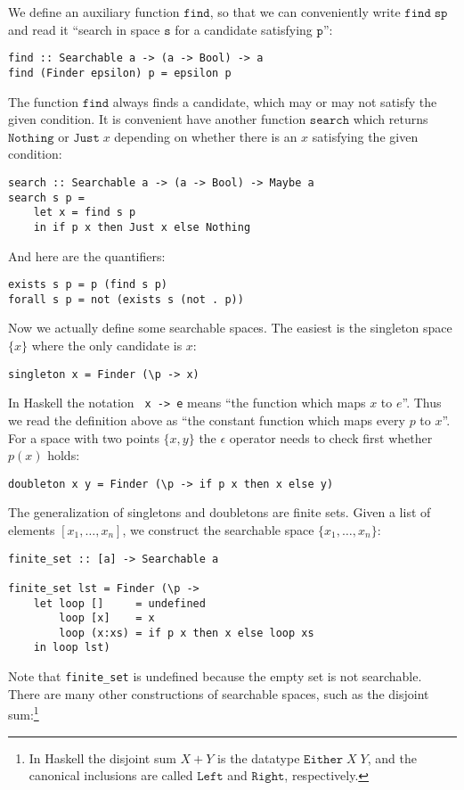 \documentclass[a4paper,10pt]{article}
\newcommand{\set}[1]{\{#1\}}
\newcommand{\R}[1]{\mathtt{#1}}
\begin{document}
We define an auxiliary function $\mathtt{find}$, so that we can
conveniently write $\R{find}\;\R{s}\R{p}$ and read it ``search in
space $\R{s}$ for a candidate satisfying $\R{p}$'':
%
\begin{lstlisting}
find :: Searchable a -> (a -> Bool) -> a
find (Finder epsilon) p = epsilon p
\end{lstlisting}
%
The function $\mathtt{find}$ always finds a candidate, which may or
may not satisfy the given condition. It is convenient have another
function $\mathtt{search}$ which returns $\mathtt{Nothing}$ or
$\mathtt{Just}\;x$ depending on whether there is an $x$ satisfying the
given condition:
% 
\begin{lstlisting}
search :: Searchable a -> (a -> Bool) -> Maybe a
search s p =
    let x = find s p
    in if p x then Just x else Nothing
\end{lstlisting}
% 
And here are the quantifiers:
% 
\begin{lstlisting}
exists s p = p (find s p)
forall s p = not (exists s (not . p))
\end{lstlisting}
% 
Now we actually define some searchable spaces. The easiest is the singleton
space $\set{x}$ where the only candidate is $x$:
% 
\begin{lstlisting}
singleton x = Finder (\p -> x)
\end{lstlisting}
% 
In Haskell the notation \texttt{ x -> e} means ``the function which
maps $x$ to $e$''. Thus we read the definition above as ``the constant
function which maps every $p$ to $x$''.
% 
For a space with two points $\set{x, y}$ the $\epsilon$ operator needs to
check first whether $p(x)$ holds:
% 
\begin{lstlisting}
doubleton x y = Finder (\p -> if p x then x else y)
\end{lstlisting}
% 
The generalization of singletons and doubletons are finite sets. Given a list
of elements $[x_1, \ldots, x_n]$, we construct the searchable space $\set{x_1,
  \ldots, x_n}$:
% 
\begin{lstlisting}
finite_set :: [a] -> Searchable a

finite_set lst = Finder (\p ->
    let loop []     = undefined
        loop [x]    = x
        loop (x:xs) = if p x then x else loop xs
    in loop lst)
\end{lstlisting}
% 
Note that \texttt{finite\_set\;[]} is undefined because the empty set is not
searchable.
% 
There are many other constructions of searchable spaces, such as the disjoint
sum:\footnote{In Haskell the disjoint sum $X + Y$ is the datatype
  $\mathtt{Either}\;X\;Y$, and the canonical inclusions are called
  $\mathtt{Left}$ and $\mathtt{Right}$, respectively.}
\end{document}
